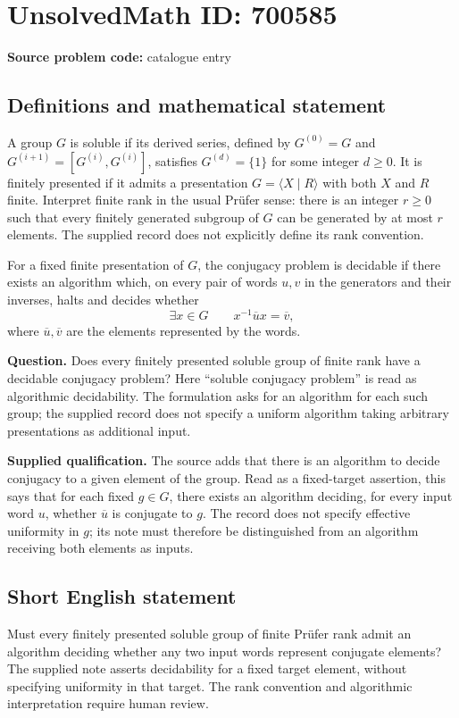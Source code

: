 \documentclass[11pt]{article}
\begin{document}
\section*{UnsolvedMath ID: 700585}
\textbf{Source problem code:} catalogue entry
\subsection{Definitions and mathematical statement}
A group \(G\) is soluble if its derived series, defined by \(G^{(0)}=G\) and \(G^{(i+1)}=[G^{(i)},G^{(i)}]\), satisfies \(G^{(d)}=\{1\}\) for some integer \(d\geq 0\). It is finitely presented if it admits a presentation \(G=\langle X\mid R\rangle\) with both \(X\) and \(R\) finite. Interpret finite rank in the usual Pr\"ufer sense: there is an integer \(r\geq 0\) such that every finitely generated subgroup of \(G\) can be generated by at most \(r\) elements. The supplied record does not explicitly define its rank convention.

For a fixed finite presentation of \(G\), the conjugacy problem is decidable if there exists an algorithm which, on every pair of words \(u,v\) in the generators and their inverses, halts and decides whether
\[
\exists x\in G\qquad x^{-1}\overline{u}x=\overline{v},
\]
where \(\overline{u},\overline{v}\) are the elements represented by the words.

\textbf{Question.} Does every finitely presented soluble group of finite rank have a decidable conjugacy problem? Here ``soluble conjugacy problem'' is read as algorithmic decidability. The formulation asks for an algorithm for each such group; the supplied record does not specify a uniform algorithm taking arbitrary presentations as additional input.

\textbf{Supplied qualification.} The source adds that there is an algorithm to decide conjugacy to a given element of the group. Read as a fixed-target assertion, this says that for each fixed \(g\in G\), there exists an algorithm deciding, for every input word \(u\), whether \(\overline{u}\) is conjugate to \(g\). The record does not specify effective uniformity in \(g\); its note must therefore be distinguished from an algorithm receiving both elements as inputs.
\subsection{Short English statement}
Must every finitely presented soluble group of finite Pr\"ufer rank admit an algorithm deciding whether any two input words represent conjugate elements? The supplied note asserts decidability for a fixed target element, without specifying uniformity in that target. The rank convention and algorithmic interpretation require human review.
\end{document}
